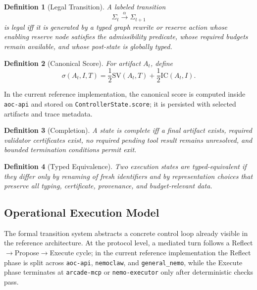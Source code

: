 \documentclass[11pt]{article}
\newtheorem{definition}{Definition}[section]
\theoremstyle{remark}
\newcommand{\SV}{\mathrm{SV}}
\newcommand{\IC}{\mathrm{IC}}
\begin{document}
\begin{definition}[Legal Transition]
A labeled transition
\[
\Sigma_t \xrightarrow{\alpha} \Sigma_{t+1}
\]
is legal iff it is generated by a typed graph rewrite or reserve action whose enabling reserve node satisfies the admissibility predicate, whose required budgets remain available, and whose post-state is globally typed.
\end{definition}

\begin{definition}[Canonical Score]
For artifact \(A_t\), define
\[
\sigma(A_t,I,T)=\frac{1}{2}\SV(A_t,T)+\frac{1}{2}\IC(A_t,I).
\]
\end{definition}
In the current reference implementation, the canonical score is computed inside \texttt{aoc-api} and stored on \texttt{ControllerState.score}; it is persisted with selected artifacts and trace metadata.

\begin{definition}[Completion]
A state is complete iff a final artifact exists, required validator certificates exist, no required pending tool result remains unresolved, and bounded termination conditions permit exit.
\end{definition}

\begin{definition}[Typed Equivalence]
Two execution states are typed-equivalent if they differ only by renaming of fresh identifiers and by representation choices that preserve all typing, certificate, provenance, and budget-relevant data.
\end{definition}

\subsection{Operational Execution Model}\label{sec:operational-execution-model}

The formal transition system abstracts a concrete control loop already visible in the reference architecture. At the protocol level, a mediated turn follows a Reflect\(\to\)Propose\(\to\)Execute cycle; in the current reference implementation the Reflect phase is split across \texttt{aoc-api}, \texttt{nemoclaw}, and \texttt{general\_nemo}, while the Execute phase terminates at \texttt{arcade-mcp} or \texttt{nemo-executor} only after deterministic checks pass.
\end{document}

